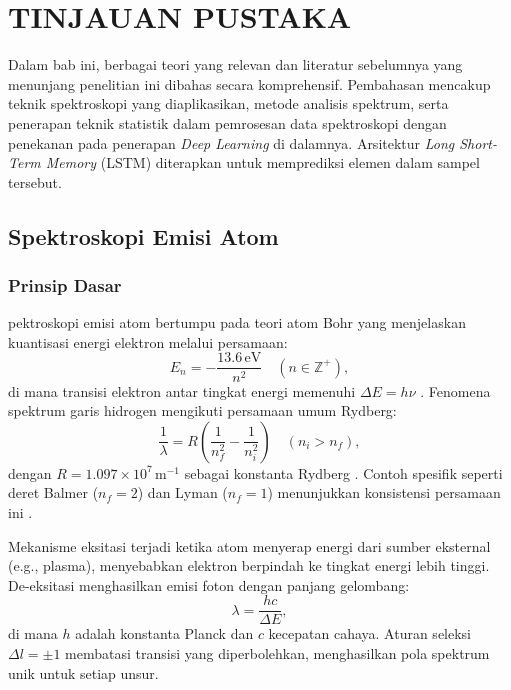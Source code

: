 \chapter{TINJAUAN PUSTAKA}
\par Dalam bab ini, berbagai teori yang relevan dan literatur sebelumnya yang menunjang penelitian ini dibahas secara komprehensif. Pembahasan mencakup teknik spektroskopi yang diaplikasikan, metode analisis spektrum, serta penerapan teknik statistik dalam pemrosesan data spektroskopi dengan penekanan pada penerapan \textit{Deep Learning} di dalamnya. Arsitektur \textit{Long Short-Term Memory} (LSTM) diterapkan untuk memprediksi elemen dalam sampel tersebut.

\section{Spektroskopi Emisi Atom}
\subsection{Prinsip Dasar}
\label{subsec:prinsip-dasar}

pektroskopi emisi atom bertumpu pada teori atom Bohr yang menjelaskan kuantisasi energi elektron melalui persamaan:
\begin{equation}
\label{eq:energi-bohr}
E_n = -\frac{13.6 \, \text{eV}}{n^2} \quad (n \in \mathbb{Z}^+),
\end{equation}
di mana transisi elektron antar tingkat energi memenuhi $\Delta E = h\nu$ \citep{Beiser1992}. Fenomena spektrum garis hidrogen mengikuti persamaan umum Rydberg:
\begin{equation}
\label{eq:rydberg-umum}
\frac{1}{\lambda} = R \left( \frac{1}{n_f^2} - \frac{1}{n_i^2} \right) \quad (n_i > n_f),
\end{equation}
dengan $R = 1.097 \times 10^7 \, \text{m}^{-1}$ sebagai konstanta Rydberg \citep{Beiser1992}. Contoh spesifik seperti deret Balmer ($n_f = 2$) dan Lyman ($n_f = 1$) menunjukkan konsistensi persamaan ini \citep{Griffiths2005}.

Mekanisme eksitasi terjadi ketika atom menyerap energi dari sumber eksternal (e.g., plasma), menyebabkan elektron berpindah ke tingkat energi lebih tinggi. De-eksitasi menghasilkan emisi foton dengan panjang gelombang:
\[
\lambda = \frac{hc}{\Delta E},
\]
di mana $h$ adalah konstanta Planck dan $c$ kecepatan cahaya. Aturan seleksi $\Delta l = \pm 1$ \citep{Liboff2003} membatasi transisi yang diperbolehkan, menghasilkan pola spektrum unik untuk setiap unsur.

